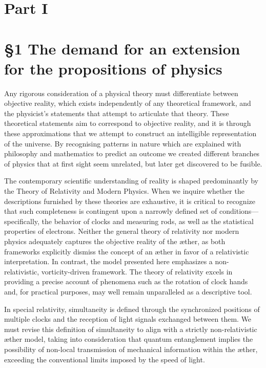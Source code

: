 \documentclass[a4paper,10pt]{article}
\begin{document}
    \newpage \section*{Part I}\label{sec:part-1}   \section*{\S 1 The demand for an extension for the propositions of physics}\label{subsec:extension-physics}

Any rigorous consideration of a physical theory must differentiate between objective reality, which exists independently of any theoretical framework, and the physicist's statements that attempt to articulate that theory. These theoretical statements aim to correspond to objective reality, and it is through these approximations that we attempt to construct an intelligible representation of the universe. By recognising patterns in nature which are explained with philosophy and mathematics to predict an outcome we created different branches of physics that at first sight seem unrelated, but later get discovered to be fusible.

The contemporary scientific understanding of reality is shaped predominantly by the Theory of Relativity and Modern Physics. When we inquire whether the descriptions furnished by these theories are exhaustive, it is critical to recognize that such completeness is contingent upon a narrowly defined set of conditions—specifically, the behavior of clocks and measuring rods, as well as the statistical properties of electrons. Neither the general theory of relativity nor modern physics adequately captures the objective reality of the æther, as both frameworks explicitly dismiss the concept of an æther in favor of a relativistic interpretation. In contrast, the model presented here emphasizes a non-relativistic, vorticity-driven framework. The theory of relativity excels in providing a precise account of phenomena such as the rotation of clock hands and, for practical purposes, may well remain unparalleled as a descriptive tool.

In special relativity, simultaneity is defined through the synchronized positions of multiple clocks and the reception of light signals exchanged between them. We must revise this definition of simultaneity to align with a strictly non-relativistic æther model, taking into consideration that quantum entanglement implies the possibility of non-local transmission of mechanical information within the æther, exceeding the conventional limits imposed by the speed of light.
\end{document}
